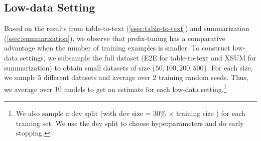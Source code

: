 \documentclass[11pt,a4paper]{article}
\newcommand\pl[1]{\textcolor{red}{[PL: #1]}}
\newcommand\lisa[1]{\textcolor{blue}{[Lisa: #1]}}
\begin{document}

\subsection{Low-data Setting}
\label{sec:lowdata}

Based on the results from table-to-text (\cref{ssec:table-to-text}) and summarization (\cref{ssec:summarization}), we observe that 
prefix-tuning has a comparative advantage when the number of training examples is smaller.
To construct low-data settings, we subsample the full dataset (E2E for table-to-text and XSUM for summarization) to obtain small datasets of size $\{ 50, 100, 200, 500 \}$. For each size, we sample $5$ different datasets and average over $2$ training random seeds. Thus, we average over $10$ models to get an estimate for each low-data setting.\footnote{We also sample a dev split (with dev size = 30\% $\times$ training size ) for each training set. We use the dev split to choose hyperparameters and do early stopping.}
\end{document}
